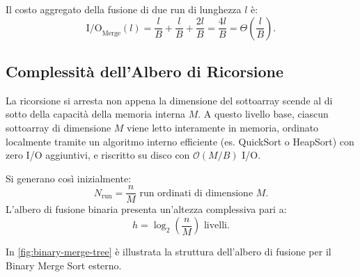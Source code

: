 Il costo aggregato della fusione di due run di lunghezza $l$ è:
\begin{equation}
  \mathrm{I/O}_{\text{Merge}}(l) = \frac{l}{B} + \frac{l}{B} + \frac{2l}{B} = \frac{4l}{B} = \Theta\left(\frac{l}{B}\right).
\end{equation}

\FloatBarrier
\subsection{Complessità dell'Albero di Ricorsione}
\label{subsec:recursion-tree}

La ricorsione si arresta non appena la dimensione del sottoarray scende al di sotto della capacità della memoria interna $M$. A questo livello base, ciascun sottoarray di dimensione $M$ viene letto interamente in memoria, ordinato localmente tramite un algoritmo interno efficiente (es. QuickSort o HeapSort) con zero I/O aggiuntivi, e riscritto su disco con $\mathcal{O}(M/B)$ I/O.

Si generano così inizialmente:
\[
  N_{\mathrm{run}} = \frac{n}{M} \text{ run ordinati di dimensione } M.
\]
L'albero di fusione binaria presenta un'altezza complessiva pari a:
\begin{equation}
  h = \log_2\left(\frac{n}{M}\right) \text{ livelli}.
\end{equation}

In \autoref{fig:binary-merge-tree} è illustrata la struttura dell'albero di fusione per il Binary Merge Sort esterno.

